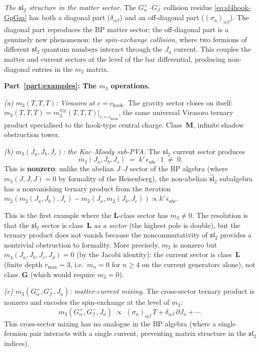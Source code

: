\begin{computation}
\emph{The $\mathfrak{sl}_2$ structure in the matter
sector.}
The $G^+_\alpha$--$G^-_\beta$ collision residue
\eqref{eq:sl4hook-GpGm} has both a diagonal part
($\delta_{\alpha\beta}$) and an off-diagonal part
($(\sigma_a)_{\alpha\beta}$). The diagonal part
reproduces the BP matter sector; the off-diagonal part
is a genuinely new phenomenon: the \emph{spin-exchange
collision}, where two fermions of different
$\mathfrak{sl}_2$ quantum numbers interact through the
$J_a$ current. This couples the matter and current
sectors at the level of the bar differential, producing
non-diagonal entries in the $m_2$ matrix.

\medskip
\noindent\textbf{Part~\ref{part:examples}: The $m_3$ operations.}

\emph{(a) $m_3(T,T,T)$: Virasoro at $c = c_{\mathrm{hook}}$.}
The gravity sector closes on itself:
$m_3(T,T,T) = m_3^{\mathrm{Vir}}(T,T,T)|_{c = c_{\mathrm{hook}}}$,
the same universal Virasoro ternary product specialised
to the hook-type central charge. Class~$\mathbf{M}$,
infinite shadow obstruction tower.

\emph{(b) $m_3(J_a, J_b, J_c)$: the Kac--Moody sub-PVA.}
The $\mathfrak{sl}_2$ current sector produces
\begin{equation}\label{eq:sl4hook-m3-JJJ}
m_3(J_a, J_b, J_c)
\;=\;
k'\,\epsilon_{abc}\cdot 1 \;\neq\; 0.
\end{equation}
This is \textbf{nonzero}: unlike the abelian $J$--$J$
sector of the BP algebra (where $m_3(J,J,J) = 0$ by
formality of the Heisenberg), the non-abelian
$\widehat{\mathfrak{sl}}_2$ subalgebra has a nonvanishing
ternary product from the iteration
$m_2(m_2(J_a, J_b), J_c) - m_2(J_a, m_2(J_b, J_c))
\propto k'\,\epsilon_{abc}$.

This is the first example where the $\mathbf{L}$-class
sector has $m_3 \neq 0$. The resolution is that the
$\mathfrak{sl}_2$ sector is class~$\mathbf{L}$
\emph{as a sector} (the highest pole is double), but
the ternary product does not vanish because the
noncommutativity of $\mathfrak{sl}_2$ provides a
nontrivial obstruction to formality.
More precisely, $m_3$ is nonzero but
$m_4(J_a,J_b,J_c,J_d) = 0$ (by the Jacobi identity):
the current sector is class~$\mathbf{L}$
(finite depth $r_{\max} = 3$, i.e.\ $m_n = 0$
for $n \ge 4$ on the current generators alone),
not class~$\mathbf{G}$ (which would require $m_3 = 0$).

\emph{(c) $m_3(G^+_\alpha, G^-_\beta, J_a)$:
matter-current mixing.}
The cross-sector ternary product is nonzero and
encodes the spin-exchange at the level of $m_3$:
\[
m_3(G^+_\alpha, G^-_\beta, J_a)
\;\propto\;
(\sigma_a)_{\alpha\beta}\,T
+ \delta_{\alpha\beta}\,\partial J_a
+ \cdots.
\]
This cross-sector mixing has no analogue in the BP
algebra (where a single fermion pair interacts with a
single current, preventing matrix structure in the
$\mathfrak{sl}_2$ indices).


\end{computation}
